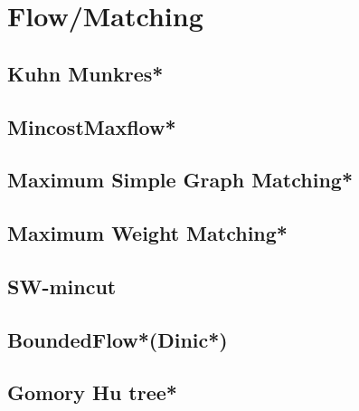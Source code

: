 \section{Flow/Matching}
% 
% 
\subsection{Kuhn Munkres*} %

\subsection{MincostMaxflow*} %

\subsection{Maximum Simple Graph Matching*} %

\subsection{Maximum Weight Matching*} %

\subsection{SW-mincut}

\subsection{BoundedFlow*(Dinic*)} %

\subsection{Gomory Hu tree*} %

